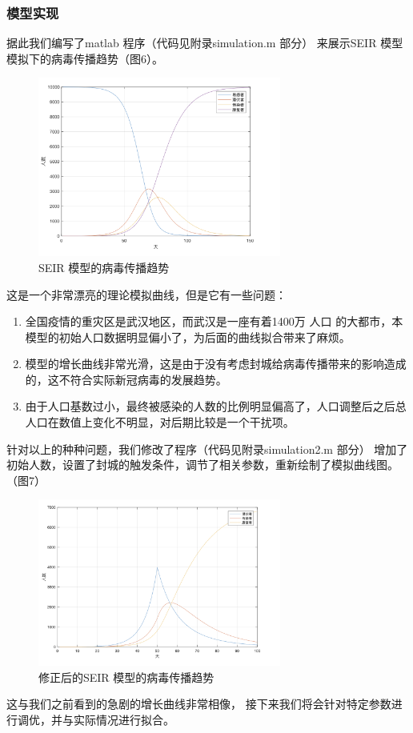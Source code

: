 \documentclass[UTF8]{ctexart}
\begin{document}
\subsubsection{模型实现}
据此我们编写了matlab 程序（代码见附录simulation.m 部分）
来展示SEIR 模型模拟下的病毒传播趋势（图6）。

\begin{figure}[htbp][H]
\centering
\includegraphics[width=8cm]{5.png} 
\caption{SEIR 模型的病毒传播趋势}
\end{figure}
\par
这是一个非常漂亮的理论模拟曲线，但是它有一些问题：
\\
\begin{enumerate}
    \item 全国疫情的重灾区是武汉地区，而武汉是一座有着1400万 人口\cite{bib2} 的大都市，本模型的初始人口数据明显偏小了，为后面的曲线拟合带来了麻烦。
    \item 模型的增长曲线非常光滑，这是由于没有考虑封城给病毒传播带来的影响造成的，这不符合实际新冠病毒的发展趋势。
    \item 由于人口基数过小，最终被感染的人数的比例明显偏高了，人口调整后之后总人口在数值上变化不明显，对后期比较是一个干扰项。
\end{enumerate}
\par 
针对以上的种种问题，我们修改了程序（代码见附录simulation2.m 部分）
增加了初始人数，设置了封城的触发条件，调节了相关参数，重新绘制了模拟曲线图。（图7）\\

\begin{figure}[htbp][H]
\centering
\includegraphics[width=8cm]{7.png} 
\caption{修正后的SEIR 模型的病毒传播趋势}
\end{figure}
\par
这与我们之前看到的急剧的增长曲线非常相像，
接下来我们将会针对特定参数进行调优，并与实际情况进行拟合。
\end{document}
